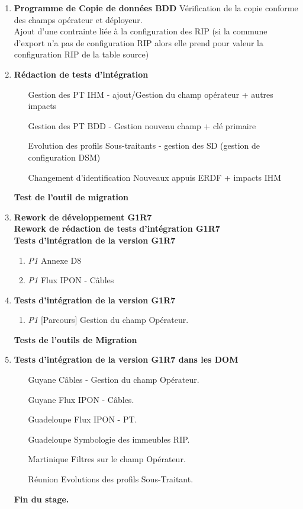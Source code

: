 \begin{enumerate}[label= Semaine \no\textbf{\arabic*.},itemsep=20pt]
\item
\textbf{Programme de Copie de données BDD} Vérification de la copie conforme des champs opérateur et déployeur.
\\ Ajout d'une contrainte liée à la configuration des RIP (si la commune d'export n'a pas
de configuration RIP alors elle prend pour valeur la configuration RIP de la table source)
\item
\textbf{Rédaction de tests d'intégration}
\begin{enumerate}[label = Développement \no\arabic*.,align=left]
	\item [Gestion des PT]  IHM - ajout/Gestion du champ opérateur + autres impacts
	\item [Gestion des PT]  BDD - Gestion nouveau champ + clé primaire
	\item [Evolution des profils] Sous-traitants - gestion des SD (gestion de configuration DSM)
	\item [Changement d’identification] Nouveaux appuis ERDF  + impacts IHM
\end{enumerate}
\textbf{Test de l'outil de migration}
\item \textbf{Rework de développement G1R7}
\\\textbf{Rework de rédaction de tests d'intégration G1R7}
\\\textbf{Tests d'intégration de la version G1R7}
\begin{enumerate}[label = Tests \no\arabic*.,align=left]
\item \emph{\colorbox{rouge}{P1}} Annexe D8
\item \emph{\colorbox{rouge}{P1}} Flux IPON - Câbles
\end{enumerate}

\item
\textbf{Tests d'intégration de la version G1R7}
\begin{enumerate}[label = Tests \no\arabic*.,align=left]
\item \emph{\colorbox{rouge}{P1}} [Parcours] Gestion du champ Opérateur.
\end{enumerate}
\textbf{Tests de l'outils de Migration}
\item
\textbf{Tests d'intégration de la version G1R7 dans les DOM}
\begin{enumerate}[label = Tests \no\arabic*.,align=left]
\item [Guyane] Câbles - Gestion du champ Opérateur.
\item [Guyane] Flux IPON - Câbles.
\item [Guadeloupe] Flux IPON - PT.
\item [Guadeloupe] Symbologie des immeubles RIP.
\item [Martinique] Filtres sur le champ Opérateur.
\item [Réunion] Evolutions des profils Sous-Traitant.
\end{enumerate}
\textbf{\colorbox{rouge}{Fin du stage. }}\\\\
\end{enumerate}
